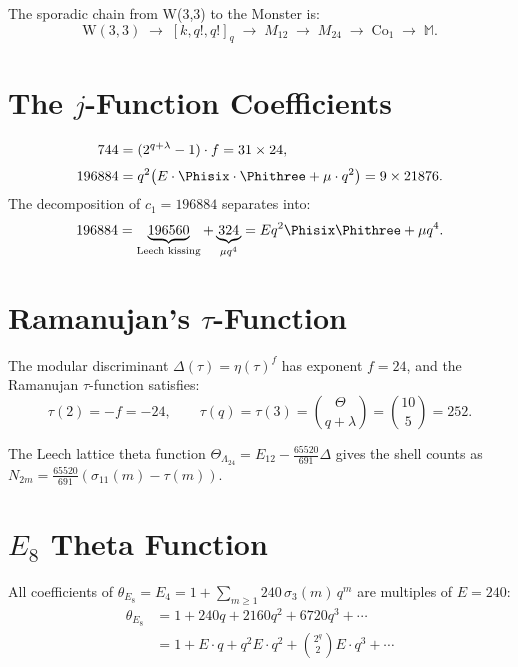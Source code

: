 The sporadic chain from W(3,3) to the Monster is:
\begin{equation}
\mathrm{W}(3,3)\;\to\;[k,q!,q!]_q\;\to\;M_{12}\;\to\;M_{24}\;\to\;\mathrm{Co}_1\;\to\;\mathbb{M}.
\end{equation}

\section{\texorpdfstring{The $j$-Function Coefficients}{The j-Function Coefficients}}

\begin{theorem}
\begin{align}
744 &= (2^{q+\lambda}-1)\cdot f = 31\times 24, \label{eq:j744}\\[3pt]
196884 &= q^2\bigl(E\cdot\Phisix\cdot\Phithree + \mu\cdot q^2\bigr)
= 9\times 21876. \label{eq:j196884}
\end{align}
The decomposition of $c_1=196884$ separates into:
\begin{equation}
196884 = \underbrace{196560}_{\text{Leech kissing}} + \underbrace{324}_{\mu q^4}
= E q^2\Phisix\Phithree + \mu q^4.
\end{equation}
\end{theorem}

\section{\texorpdfstring{Ramanujan's $\tau$-Function}{Ramanujan's tau-Function}}

The modular discriminant $\Delta(\tau) = \eta(\tau)^{f}$ has
exponent $f=24$, and the Ramanujan $\tau$-function satisfies:
\begin{equation}
\tau(2) = -f = -24, \qquad
\boxed{\tau(q) = \tau(3) = \binom{\Theta}{q+\lambda} = \binom{10}{5} = 252.}
\end{equation}

The Leech lattice theta function
$\Theta_{\Lambda_{24}} = E_{12} - \frac{65520}{691}\Delta$
gives the shell counts as $N_{2m} = \frac{65520}{691}(\sigma_{11}(m)-\tau(m))$.

\section{\texorpdfstring{$E_8$ Theta Function}{E8 Theta Function}}

All coefficients of $\theta_{E_8} = E_4 = 1 + \sum_{m\geq 1}240\,\sigma_3(m)\,q^m$
are multiples of $E=240$:
\begin{align}
\theta_{E_8} &= 1 + 240q + 2160q^2 + 6720q^3 + \cdots \\
&= 1 + E\cdot q + q^2 E\cdot q^2 + \binom{2^q}{2}E\cdot q^3 + \cdots
\end{align}

